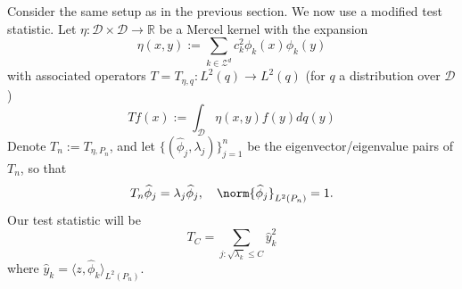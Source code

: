 \documentclass{article}
\newcommand{\Reals}{\mathbb{R}}
\newcommand{\dotp}[2]{\langle #1, #2 \rangle}
\newcommand{\1}{\mathbb{I}}
\newcommand{\D}{\mathcal{D}}
\theoremstyle{alden}
\theoremstyle{aldenthm}
\theoremstyle{definition}
\theoremstyle{remark}
\begin{document}
Consider the same setup as in the previous section. We now use a modified test statistic. Let $\eta: \mathcal{D} \times \mathcal{D} \to \Reals$ be a Mercel kernel with the expansion
\begin{equation*}
\eta(x,y) := \sum_{k \in \mathcal{Z}^d} c_k^2 \phi_k(x) \phi_k(y)
\end{equation*}
with associated operators $T = T_{\eta,q}: L^2(q) \to L^2(q)$ (for $q$ a distribution over $\mathcal{D}$) 
\begin{equation*}
Tf(x):= \int_{\D} \eta(x,y) f(y) dq(y)
\end{equation*}
Denote $T_n := T_{\eta,P_n}$, and let $\{(\widehat{\phi}_j, \lambda_j)\}_{j = 1}^{n}$ be the eigenvector/eigenvalue pairs of $T_n$, so that
\begin{equation*}
T_n \widehat{\phi}_j = \lambda_j \widehat{\phi}_j, \quad \norm{\widehat{\phi}_j}_{L^2(P_n)} = 1.
\end{equation*}
Our test statistic will be
\begin{equation*}
T_C = \sum_{j: \sqrt{\lambda_k} \leq C} \widehat{y}_k^2
\end{equation*}
where $\widehat{y}_k = \dotp{z}{\widehat{\phi}_k}_{L^2(P_n)}$. 
\end{document}
